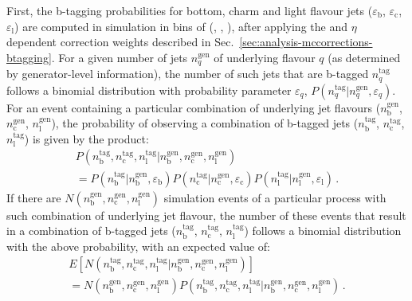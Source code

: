 First, the b-tagging probabilities for bottom, charm and light flavour jets 
($\varepsilon_\mathrm b$, $\varepsilon_\mathrm c$, $\varepsilon_\mathrm l$) are 
computed in simulation in bins of (\nj, \scalht, \mht), after applying the \pt 
and $\eta$ dependent correction weights described in 
Sec.~\ref{sec:analysis-mccorrections-btagging}.
For a given number of jets $n_q^\mathrm{gen}$ of underlying flavour $q$ (as 
determined by generator-level information), the number of such jets that are 
b-tagged $n_q^\mathrm{tag}$ follows a binomial distribution with probability 
parameter $\varepsilon_q$, $P(n_q^\mathrm{tag}|n_q^\mathrm{gen}, 
\varepsilon_q)$. For an event containing a particular combination of 
underlying jet flavours ($n_\mathrm b^\mathrm{gen}$, $n_\mathrm 
c^\mathrm{gen}$, $n_\mathrm l^\mathrm{gen}$), the probability of observing a 
combination of b-tagged jets ($n_\mathrm b^\mathrm{tag}$, $n_\mathrm 
c^\mathrm{tag}$, $n_\mathrm l^\mathrm{tag}$) is given by the product:
\begin{multline}
P\left( n_\mathrm b^\mathrm{tag}, n_\mathrm c^\mathrm{tag}, n_\mathrm 
l^\mathrm{tag} | n_\mathrm b^\mathrm{gen}, n_\mathrm c^\mathrm{gen}, n_\mathrm 
l^\mathrm{gen} \right) \\ = P\left(n_\mathrm b^\mathrm{tag}|n_\mathrm 
b^\mathrm{gen}, \varepsilon_\mathrm b\right) P\left(n_\mathrm 
c^\mathrm{tag}|n_\mathrm c^\mathrm{gen}, \varepsilon_\mathrm c\right) 
P\left(n_\mathrm l^\mathrm{tag}|n_\mathrm l^\mathrm{gen}, \varepsilon_\mathrm 
l\right) \, .
\end{multline}
If there are $N\left(n_\mathrm b^\mathrm{gen}, n_\mathrm 
c^\mathrm{gen}, n_\mathrm l^\mathrm{gen}\right)$ simulation events of a 
particular process with such 
combination of underlying jet flavour, the number of these events that result 
in a combination of b-tagged jets ($n_\mathrm b^\mathrm{tag}$, $n_\mathrm 
c^\mathrm{tag}$, $n_\mathrm l^\mathrm{tag}$) follows a binomial distribution 
with the above probability, with an expected value of:
\begin{multline}
E\left[N\left(n_\mathrm 
b^\mathrm{tag}, n_\mathrm c^\mathrm{tag}, n_\mathrm l^\mathrm{tag} | n_\mathrm 
b^\mathrm{gen}, n_\mathrm c^\mathrm{gen}, n_\mathrm l^\mathrm{gen}\right) 
\right] \\ = N\left(n_\mathrm 
b^\mathrm{gen}, n_\mathrm c^\mathrm{gen}, n_\mathrm l^\mathrm{gen}\right) 
P\left( n_\mathrm b^\mathrm{tag}, n_\mathrm c^\mathrm{tag}, n_\mathrm 
l^\mathrm{tag} | n_\mathrm b^\mathrm{gen}, n_\mathrm c^\mathrm{gen}, n_\mathrm 
l^\mathrm{gen} \right) \, .
\end{multline}
